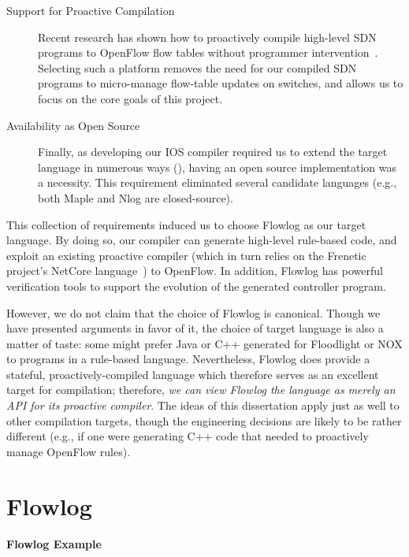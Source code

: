 \begin{description}
\item[Support for Proactive Compilation] Recent
  research has shown how to proactively
  compile high-level SDN programs to OpenFlow flow tables without
  programmer intervention~\cite{monsanto:popl12-netcore}. Selecting such a platform removes the need
  for our compiled SDN programs to micro-manage flow-table updates on
  switches, and allows us to focus on the core goals of this
  project. %

\item[Availability as Open Source] Finally, as developing our IOS
  compiler required us to extend the target language in numerous ways
  (), having an open source implementation was
  a necessity. This requirement eliminated several candidate languages
  (e.g., both Maple and Nlog are closed-source).

\end{description}
This collection of requirements induced us to choose Flowlog as
our target language. By doing so, our compiler can generate high-level
rule-based code, and exploit an existing proactive compiler (which in
turn relies on the Frenetic project's
NetCore language~\cite{monsanto:popl12-netcore}) to OpenFlow. In
addition, Flowlog has powerful verification tools to support the
evolution of the generated controller program.

However, we do not claim that the choice of Flowlog is
canonical. Though we have presented arguments in favor of it,
the choice of target language is also a matter of taste:
some might prefer Java or C++ generated for Floodlight or
NOX to programs in a rule-based
language. Nevertheless, Flowlog does provide a stateful,
proactively-compiled language which therefore serves as an excellent
target for compilation; therefore, \emph{we can view Flowlog the
  language as merely an API for its proactive compiler}. The ideas of
this dissertation apply just as well to other compilation targets, though the
engineering decisions are likely to be rather different (e.g., if one
were generating C++ code that needed to proactively manage OpenFlow
rules).

\section{Flowlog}
\label{sec:exodus-flowlog}

\paragraph{Flowlog Example}

